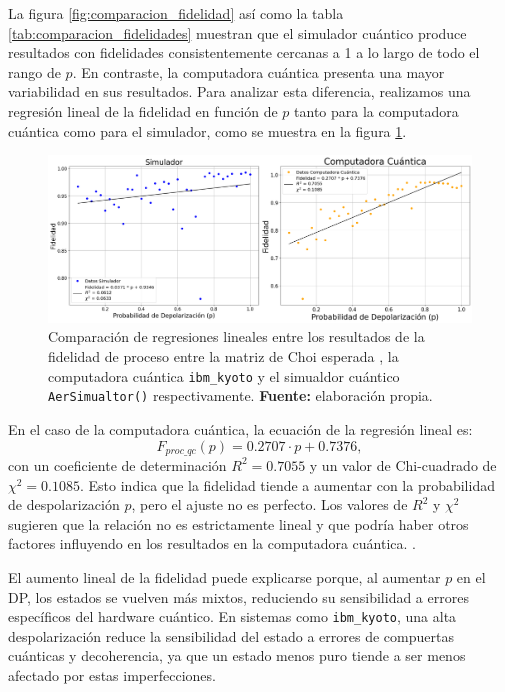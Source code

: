 \documentclass[letterpaper,12pt]{thesisECFM}
\theoremstyle{plain}
\theoremstyle{definition}
\theoremstyle{definition}
\theoremstyle{remark}
\newcommand{\1}{\mathbb{1}}
\begin{document}
La figura \ref{fig:comparacion_fidelidad} así como la tabla
\ref{tab:comparacion_fidelidades} muestran que el simulador cuántico produce
resultados con fidelidades consistentemente cercanas a 1 a lo largo de todo el
rango de $p$. En contraste, la computadora cuántica presenta una mayor
variabilidad en sus resultados. Para analizar esta diferencia, realizamos una
regresión lineal de la fidelidad en función de $p$ tanto para la computadora
cuántica como para el simulador, como se muestra en la figura
\ref{fig:comparacion_regresiones}.

\begin{figure}[h!]
    \centering
    \includegraphics[width=0.95\linewidth]{imagenes/Comparacion_regresiones.png}
    \caption{Comparación de regresiones lineales entre los resultados de la fidelidad de proceso entre la matriz de Choi esperada , la computadora cuántica \texttt{ibm\_kyoto} y el simualdor cuántico \texttt{AerSimualtor()} respectivamente. \textbf{Fuente:} elaboración propia.}
    \label{fig:comparacion_regresiones}
\end{figure}

En el caso de la computadora cuántica, la ecuación de la regresión lineal es:
\begin{equation}
    F_{proc\_qc}(p) = 0.2707 \cdot p + 0.7376,
\end{equation}
con un coeficiente de determinación $R^2 = 0.7055$ y un valor de Chi-cuadrado
de $\chi^2 = 0.1085$.  Esto indica que la fidelidad tiende a aumentar con la
probabilidad de despolarización $p$, pero el ajuste no es perfecto. Los valores
de $R^2$ y $\chi^2$ sugieren que la relación no es estrictamente lineal y que
podría haber otros factores influyendo en los resultados en la computadora
cuántica. . 

El aumento lineal de la fidelidad puede explicarse porque,
al aumentar $p$ en el DP, los estados se vuelven más
mixtos, reduciendo su sensibilidad a errores específicos del hardware cuántico.
En sistemas como \texttt{ibm\_kyoto}, una alta despolarización reduce la
sensibilidad del estado a errores de compuertas cuánticas y decoherencia, ya
que un estado menos puro tiende a ser menos afectado por estas imperfecciones.
\end{document}

